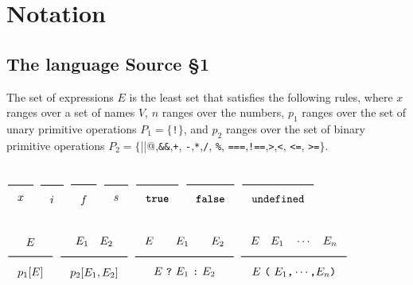 

\newcommand{\Rule}[2]{\genfrac{}{}{0.7pt}{}{{\setlength{\fboxrule}{0pt}\setlength{\fboxsep}{3mm}\fbox{$#1$}}}{{\setlength{\fboxrule}{0pt}\setlength{\fboxsep}{3mm}\fbox{$#2$}}}}

\newcommand{\TruE}{\textbf{\texttt{true}}}
\newcommand{\FalsE}{\textbf{\texttt{false}}}
\newcommand{\Rc}{\texttt{\}}}
\newcommand{\Lc}{\texttt{\{}}
\newcommand{\Rp}{\texttt{)}}
\newcommand{\Lp}{\texttt{(}}
\newcommand{\Fun}{\textbf{\texttt{function}}}
\newcommand{\Let}{\textbf{\texttt{let}}}
\newcommand{\Return}{\textbf{\texttt{return}}}
\newcommand{\Const}{\textbf{\texttt{const}}}
\newcommand{\If}{\textbf{\texttt{if}}}
\newcommand{\Else}{\textbf{\texttt{else}}}
\newcommand{\Bool}{\texttt{bool}}
\newcommand{\Float}{\texttt{float}}
\newcommand{\Int}{\texttt{int}}
\newcommand{\Undefined}{\texttt{undefined}}

\newtheorem{definition}{Definition}[section]




\section{Notation}  

\subsection{The language Source \S 1}

The set of expressions $E$ is the least set that satisfies the following rules, 
where $x$ ranges over a set of names $V$, 
$n$ ranges over the numbers, $p_1$ ranges over the set of 
unary primitive operations 
$P_1 = \{$\verb#!#$\}$, and $p_2$ ranges over the set of binary 
primitive operations
$P_2 = \{$\verb@||@,\verb#&&#,\verb#+#,
\verb#-#,\verb#*#,\verb#/#, \verb#%#, \verb#===#,\verb#!==#,\verb#>#,\verb#<#, \verb#<=#, \verb#>=#$\}$.

$\Rule{}{x}$
\hfill 
$\Rule{}{i}$
\hfill 
$\Rule{}{f}$
\hfill 
$\Rule{}{s}$
\hfill 
$\Rule{}{\TruE}$
\hfill 
$\Rule{}{\FalsE}$
\hfill 
$\Rule{}{\Undefined}$

$\Rule{E}{p_1[E]}$
\hfill
$\Rule{E_1\quad E_2}{p_2[E_1, E_2]}$
\hfill
$\Rule{E \qquad E_1 \qquad E_2}{E\ \texttt{?}\ E_1\ \texttt{:}\ E_2}$
\hfill
$\Rule{E\quad E_1\quad \cdots \quad E_n}{E\ \Lp\ E_1\texttt{,}\cdots\texttt{,} E_n\Rp}$

